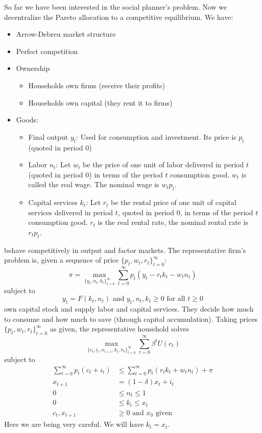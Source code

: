 \documentclass[10pt]{article}
\begin{document}
\begin{model}
	 So far we have been interested in the social planner's problem. Now we decentralize the Pareto allocation to a competitive equilibrium. We have:
	\begin{itemize}
		\item Arrow-Debreu market structure
		\item Perfect competition
		\item Ownership
		\begin{itemize}
			\item Households own firms (receive their profits)
			\item Households own capital (they rent it to firms)
		\end{itemize}
		\item Goods:
		\begin{itemize}
			\item Final output $y_t$: Used for consumption and investment. Its price is $p_t$ (quoted in period 0)
			\item Labor $n_t$: Let $w_t$ be the price of one unit of labor delivered in period $t$ (quoted in period 0) in terms of the period $t$ consumption good. $w_t$ is called the real wage. The nominal wage is $w_tp_t$.
			\item Capital services $k_t$: Let $r_t$ be the rental price of one unit of capital services delivered in period $t$, quoted in period 0, in terms of the period $t$ consumption good. $r_t$ is the real rental rate, the nominal rental rate is $r_tp_t$.
		\end{itemize}
	\end{itemize}
	
	 behave competitively in output and factor markets. The representative firm's problem is, given a sequence of price $\{p_t,w_t,r_t\}_{t=0}^\infty$:
	\[
	\pi = \max_{\{y_t,n_t,k_t\}_{t=0}^\infty} \sum_{t=0}^\infty p_t(y_t - r_tk_t - w_tn_t)
	\]
	subject to
	\[
	y_t = F(k_t,n_t) \text{ and } y_t,n_t,k_t \ge 0 \text{ for all } t \ge 0
	\]
	 own capital stock and supply labor and capital services. They decide how much to consume and how much to save (through capital accumulation). Taking prices $\{p_t,w_t,r_t\}_{t=0}^\infty$ as given, the representative household solves
	\[
	\max_{\{c_t,i_t,x_{t+1},k_t,n_t\}_{t=0}^\infty} \sum_{t=0}^\infty \beta^t U(c_t)
	\]
	subject to
	\begin{align*}
		\sum_{t=0}^\infty p_t(c_t + i_t) &\le \sum_{t=0}^\infty p_t(r_tk_t + w_tn_t) + \pi \\
		x_{t+1} &= (1 - \delta)x_t + i_t \\
		0 &\le n_t \le 1 \\
		0 &\le k_t \le x_t \\
		c_t,x_{t+1} &\ge 0 \text{ and } x_0 \text{ given}
	\end{align*}
	Here we are being very careful. We will have $k_t = x_t$.
\end{model}
	
\end{document}
